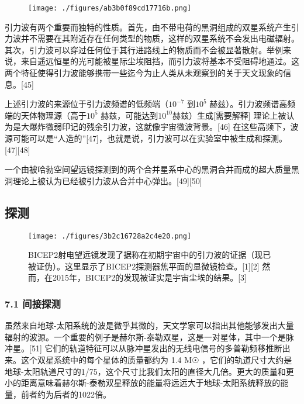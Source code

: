 \begin{figure}[ht]
\centering
\texttt{[image: ./figures/ab3b0f89cd17716b.png]}
\caption \label{fig_YLB_8}
\end{figure}

引力波有两个重要而独特的性质。首先，由不带电荷的黑洞组成的双星系统产生引力波并不需要在其附近存在任何类型的物质，这样的双星系统不会发出电磁辐射。其次，引力波可以穿过任何位于其行进路线上的物质而不会被显著散射。举例来说，来自遥远恒星的光可能被星际尘埃阻挡，而引力波将基本不受阻碍地通过。这两个特征使得引力波能够携带一些迄今为止人类从未观察到的关于天文现象的信息。[45]

上述引力波的来源位于引力波频谱的低频端（$10^{-7}$ 到$10^{5}$ 赫兹）。引力波频谱高频端的天体物理源（高于$10^{5}$ 赫兹，可能达到$10^{10}$赫兹）生成[需要解释] 理论上被认为是大爆炸微弱印记的残余引力波，这就像宇宙微波背景。[46] 在这些高频下，波源可能可以是“人造的”[47]，也就是说，引力波可以在实验室中被生成和探测。[47][48]

一个由被哈勃空间望远镜探测到的两个合并星系中心的黑洞合并而成的超大质量黑洞理论上被认为已经被引力波从合并中心弹出。[49][50]

\subsection{探测}

\begin{figure}[ht]
\centering
\texttt{[image: ./figures/3b2c16728a2c4e20.png]}
\caption{BICEP2射电望远镜发现了据称在初期宇宙中的引力波的证据（现已被证伪）。这里显示了BICEP2探测器焦平面的显微镜检查。[1][2] 然而，在2015年，BICEP2的发现被证实是宇宙尘埃的结果。[3]} \label{fig_YLB_9}
\end{figure}

\subsubsection{7.1 间接探测}

虽然来自地球-太阳系统的波是微乎其微的，天文学家可以指出其他能够发出大量辐射的波源。一个重要的例子是赫尔斯-泰勒双星，这是一对星体，其中一个是脉冲星。[51] 它们的轨道特征可以从脉冲星发出的无线电信号的多普勒频移推断出来。这个双星系统中的每个星体的质量都约为 1.4 M☉ ，它们的轨道尺寸大约是地球-太阳轨道尺寸的1/75，这个尺寸比我们太阳的直径大几倍。更大的质量和更小的距离意味着赫尔斯-泰勒双星释放的能量将远远大于地球-太阳系统释放的能量，前者约为后者的1022倍。

